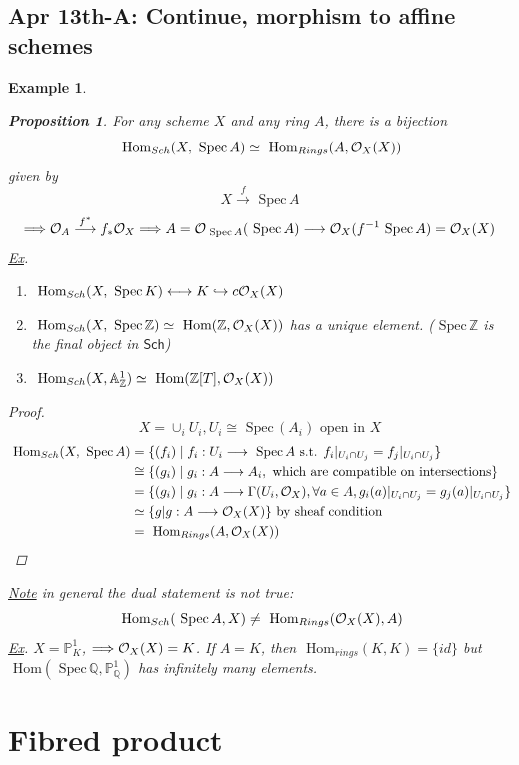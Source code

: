 \documentclass[11pt]{article}
\newtheorem{prop}[thm]{Proposition}
\newtheorem{ex}[thm]{Example}
\renewcommand{\hom}{\text{ Hom}}
\newcommand{\spec}{\text{ Spec}\,}
\newcommand{\affn}{\mathbb A}
\newcommand{\proj}{\mathbb P}
\newcommand{\intg}{\mathbb Z}
\newcommand{\ratl}{\mathbb Q}
\newcommand{\calo}{{\cal O}}
\newcommand{\Lrta}{\Longrightarrow}
\newcommand{\lrta}{\longrightarrow}
\newcommand{\llrta}{\longleftrightarrow}
\newcommand{\inj}{\hookrightarrow}
\begin{document}
\subsection{Apr 13th-A: Continue, morphism to affine schemes }
\begin{ex}
\begin{prop}
For any scheme $X$ and any ring $A$, there is a bijection
$$
\hom_{Sch}(X,\spec A)\simeq \hom_{Rings}(A,\calo_X(X))
$$
given by 
$$
X\overset{f}{\lrta}\spec A
$$
$$
\Lrta \calo_A\overset{f^*}{\lrta} f_*\calo_X\Lrta A=\calo_{\spec A}(\spec A)\lrta \calo_X(f^{-1}\spec A)=\calo_X(X)
$$
\underline{Ex}.\begin{enumerate}[label=(\arabic*)]
\item $\hom_{Sch}(X,\spec K)\llrta K\inj c\calo_X(X)$
\item $\hom_{Sch}(X,\spec \intg)\simeq \hom(\intg,\calo_X(X))$ has a unique element. ($\spec \intg$ is the final object in $\mathsf{Sch}$) 
\item $\hom_{Sch}(X,\affn^1_\intg)\simeq\hom(\intg[T],\calo_X(X))$
\end{enumerate}
\end{prop}
\begin{proof}
$$
X=\cup_i U_i, U_i\cong\spec(A_i)\text{ open in } X
$$
$$
\begin{aligned}
\hom_{Sch}(X,\spec A)&=\{(f_i)\mid f_i:U_i\lrta \spec A\text{ s.t. }f_i|_{U_i\cap U_j}=f_j|_{U_i\cap U_j}\}\\
&\cong\{(g_i)\mid g_i:A\lrta A_i,\text{ which are compatible on intersections} \}\\
&=\{(g_i)\mid g_i: A\lrta \Gamma(U_i, \calo_X),\forall a\in A, g_i(a)|_{U_i\cap U_j}=g_j(a)|_{U_i\cap U_j}\}\\
&\simeq\{g|g:A\lrta \calo_X(X)\}\text{ by sheaf condition}\\
&=\hom_{Rings}(A,\calo_X(X))
\end{aligned}
$$
\end{proof}
\underline{Note} in general the dual statement is not true:
$$
\hom_{Sch}(\spec A, X)\neq \hom_{Rings}(\calo_X(X),A)
$$
\underline{Ex}. $X=\proj^1_K$, $\Lrta \calo_X(X)=K$. If $A=K$, then $\hom_{rings}(K,K)=\{id\}$ but 
$\hom(\spec \ratl,\proj^1_\ratl)$ has infinitely many elements.
\end{ex}
\section{Fibred product}
\end{document}
